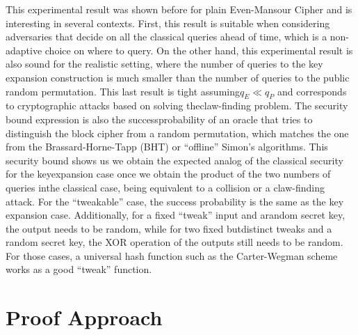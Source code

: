 \documentclass[12pt]{article}
\begin{document}
    \noindent This experimental result was shown before for plain Even-Mansour Cipher \cite{jaeger-song-tessaro:quantum-key-length-extension:2021:03-2024} and is interesting in several contexts. First, this result is suitable when considering adversaries that decide on all the classical queries ahead of time, which is a non-adaptive choice on where to query. On the other hand, this experimental result is also sound for the realistic setting, where the number of queries to the key expansion construction is much smaller than the number of queries to the public random permutation. This last result is tight assuming\break ${q}_{E} \ll {q}_{P}$ and corresponds to cryptographic attacks based on solving the\break claw-finding problem. The security bound expression is also the success\break probability of an oracle that tries to distinguish the block cipher from a random permutation, which matches the one from the Brassard-Horne-Tapp (BHT) \cite{brassard-hoyer-tapp:quantum-cryptanalysis-hash-claw-free-functions-1998:03-2024} or ``offline'' Simon's \cite{simon:power-quantum-computation:1997:03-2024,bonnetain-et-al:quantum-attacks-without-superposition-queries-offline-simons-algorithm:2019:03-2024} algorithms. This security bound shows us we obtain the expected analog of the classical security for the key\break expansion case once we obtain the product of the two numbers of queries in\break the classical case, being equivalent to a collision \cite{wang-feng-lai-yu:collisions-hash-functions-md4-md5-haval-128-ripemd:2004:03-2024,stevens:fast-collision-attack-md5:2006:03-2024} or a claw-finding\break \cite{diffie-hellman:special-feature-exhaustive-cryptanalysis-nbs-data-encryption-standard:1977:03-2024,zhang:promised-distributed-quantum-search:2005:03-2024,tani:claw-finding-algorithms-using-quantum-walk:2009:03-2024} attack. For the ``tweakable'' case, the success probability is the same as the key expansion case. Additionally, for a fixed ``tweak'' input and a\break random secret key, the output needs to be random, while for two fixed but\break distinct tweaks and a random secret key, the XOR operation of the outputs still needs to be random. For those cases, a universal hash function such as the Carter-Wegman scheme \cite{carter-wegman:universal-classes-hash-functions:1977:03-2024,wegman-carter:new-hash-functions-their-use-authentication-set-equality:1981:03-2024} works as a good ``tweak'' function.

    
    \section{Proof Approach}
    \label{sec:proof-approach}
\end{document}
